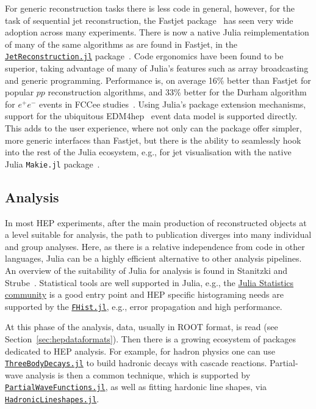 \documentclass{webofc}
\begin{document}
For generic reconstruction tasks there is less code in general, however, for the
task of sequential jet reconstruction, the Fastjet
package~\cite{Cacciari:2011ma} has seen very wide adoption across many
experiments. There is now a native Julia reimplementation of many of the same
algorithms as are found in Fastjet, in the
\href{https://doi.org/10.5281/zenodo.12671414}{\texttt{JetReconstruction.jl}}
package~\cite{polyglot-jets-chep23}. Code ergonomics have been found to be
superior, taking advantage of many of Julia's features such as array
broadcasting and generic programming. Performance is, on average 16\% better
than Fastjet for popular $pp$ reconstruction algorithms, and 33\% better for the
Durham algorithm for $e^+e^-$ events in FCCee
studies~\cite{fast-jet-reco-julia}. Using Julia's package extension mechanisms,
support for the ubiquitous EDM4hep~\cite{Gaede:2022leb} event data model is
supported directly. This adds to the user experience, where not only can the
package offer simpler, more generic interfaces than Fastjet, but there is the
ability to seamlessly hook into the rest of the Julia ecosystem, e.g., for jet
visualisation with the native Julia \texttt{Makie.jl}
package~\cite{Danisch2021}.

\subsection{Analysis}

In most HEP experiments, after the main production of reconstructed objects at a
level suitable for analysis, the path to publication diverges into many
individual and group analyses. Here, as there is a relative independence from
code in other languages, Julia can be a highly efficient alternative to other
analysis pipelines. An overview of the suitability of Julia for analysis is
found in Stanitzki and Strube~\cite{Stanitzki:2020bnx}. Statistical tools are
well supported in Julia, e.g., the \href{https://github.com/JuliaStats/}{Julia Statistics
community} is a good entry point and HEP
specific histograming needs are supported by the
\href{https://github.com/Moelf/FHist.jl/}{\texttt{FHist.jl}}, e.g., error
propagation and high performance.

At this phase of the analysis, data, usually in ROOT format, is read (see
Section~\ref{sec:hepdataformats}). Then there is a growing ecosystem of packages
dedicated to HEP analysis. For example, for hadron physics one can use
\href{https://github.com/mmikhasenko/ThreeBodyDecays.jl}{\texttt{ThreeBodyDecays.jl}}
to build hadronic decays with cascade reactions. Partial-wave analysis is then a
common technique, which is supported by
\href{https://github.com/mmikhasenko/PartialWaveFunctions.jl}{\texttt{PartialWaveFunctions.jl}},
as well as fitting hardonic line shapes, via
\href{https://github.com/mmikhasenko/HadronicLineshapes.jl}{\texttt{HadronicLineshapes.jl}}.
\end{document}
